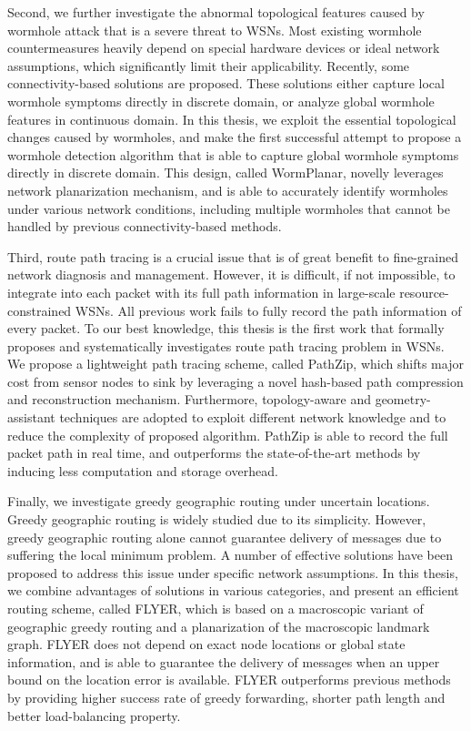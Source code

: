 \begin{eabstract}
Second, we further investigate the abnormal topological features caused by wormhole attack that is a severe threat to WSNs. Most existing wormhole countermeasures heavily depend on special hardware devices or ideal network assumptions, which significantly limit their applicability. Recently, some connectivity-based solutions are proposed. These solutions either capture local wormhole symptoms directly in discrete domain, or analyze global wormhole features in continuous domain. In this thesis, we exploit the essential topological changes caused by wormholes, and make the first successful attempt to propose a wormhole detection algorithm that is able to capture global wormhole symptoms directly in discrete domain. This design, called WormPlanar, novelly leverages network planarization mechanism, and is able to accurately identify wormholes under various network conditions, including multiple wormholes that cannot be handled by previous connectivity-based methods.

Third, route path tracing is a crucial issue that is of great benefit to fine-grained network diagnosis and management. However, it is difficult, if not impossible, to integrate into each packet with its full path information in large-scale resource-constrained WSNs. All previous work fails to fully record the path information of every packet. To our best knowledge, this thesis is the first work that formally proposes and systematically investigates route path tracing problem in WSNs. We propose a lightweight path tracing scheme, called PathZip, which shifts major cost from sensor nodes to sink by leveraging a novel hash-based path compression and reconstruction mechanism. Furthermore, topology-aware and geometry-assistant techniques are adopted to exploit different network knowledge and to reduce the complexity of proposed algorithm. PathZip is able to record the full packet path in real time, and outperforms the state-of-the-art methods by inducing less computation and storage overhead.

Finally, we investigate greedy geographic routing under uncertain locations. Greedy geographic routing is widely studied due to its simplicity. However, greedy geographic routing alone cannot guarantee delivery of messages due to suffering the local minimum problem. A number of effective solutions have been proposed to address this issue under specific network assumptions. In this thesis, we combine advantages of solutions in various categories, and present an efficient routing scheme, called FLYER, which is based on a macroscopic variant of geographic greedy routing and a planarization of the macroscopic landmark graph. FLYER does not depend on exact node locations or global state information, and is able to guarantee the delivery of messages when an upper bound on the location error is available. FLYER outperforms previous methods by providing higher success rate of greedy forwarding, shorter path length and better load-balancing property.


\end{eabstract}
